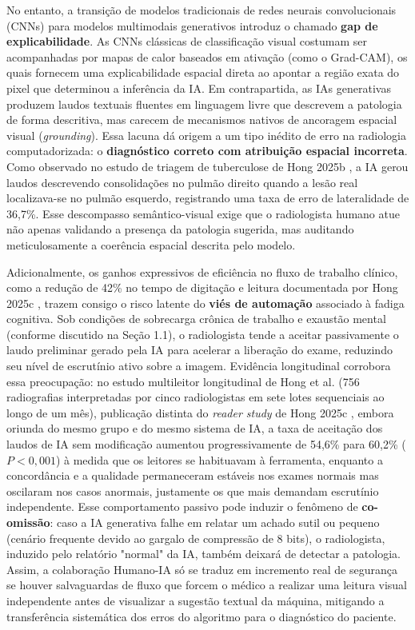 \documentclass[12pt,a4paper]{article}
\begin{document}
No entanto, a transição de modelos tradicionais de redes neurais convolucionais (CNNs) para modelos multimodais generativos introduz o chamado \textbf{gap de explicabilidade}. As CNNs clássicas de classificação visual costumam ser acompanhadas por mapas de calor baseados em ativação (como o Grad-CAM), os quais fornecem uma explicabilidade espacial direta ao apontar a região exata do pixel que determinou a inferência da IA. Em contrapartida, as IAs generativas produzem laudos textuais fluentes em linguagem livre que descrevem a patologia de forma descritiva, mas carecem de mecanismos nativos de ancoragem espacial visual (\textit{grounding}). Essa lacuna dá origem a um tipo inédito de erro na radiologia computadorizada: o \textbf{diagnóstico correto com atribuição espacial incorreta}. Como observado no estudo de triagem de tuberculose de Hong 2025b \cite{hong2025b}, a IA gerou laudos descrevendo consolidações no pulmão direito quando a lesão real localizava-se no pulmão esquerdo, registrando uma taxa de erro de lateralidade de 36,7\%. Esse descompasso semântico-visual exige que o radiologista humano atue não apenas validando a presença da patologia sugerida, mas auditando meticulosamente a coerência espacial descrita pelo modelo.

Adicionalmente, os ganhos expressivos de eficiência no fluxo de trabalho clínico, como a redução de 42\% no tempo de digitação e leitura documentada por Hong 2025c \cite{hong2025c}, trazem consigo o risco latente do \textbf{viés de automação} associado à fadiga cognitiva. Sob condições de sobrecarga crônica de trabalho e exaustão mental (conforme discutido na Seção 1.1), o radiologista tende a aceitar passivamente o laudo preliminar gerado pela IA para acelerar a liberação do exame, reduzindo seu nível de escrutínio ativo sobre a imagem. Evidência longitudinal corrobora essa preocupação: no estudo multileitor longitudinal de Hong et al. \cite{hongjacr} (756 radiografias interpretadas por cinco radiologistas em sete lotes sequenciais ao longo de um mês), publicação distinta do \textit{reader study} de Hong 2025c \cite{hong2025c}, embora oriunda do mesmo grupo e do mesmo sistema de IA, a taxa de aceitação dos laudos de IA sem modificação aumentou progressivamente de 54,6\% para 60,2\% ($P < 0,001$) à medida que os leitores se habituavam à ferramenta, enquanto a concordância e a qualidade permaneceram estáveis nos exames normais mas oscilaram nos casos anormais, justamente os que mais demandam escrutínio independente. Esse comportamento passivo pode induzir o fenômeno de \textbf{co-omissão}: caso a IA generativa falhe em relatar um achado sutil ou pequeno (cenário frequente devido ao gargalo de compressão de 8 bits), o radiologista, induzido pelo relatório "normal" da IA, também deixará de detectar a patologia. Assim, a colaboração Humano-IA só se traduz em incremento real de segurança se houver salvaguardas de fluxo que forcem o médico a realizar uma leitura visual independente antes de visualizar a sugestão textual da máquina, mitigando a transferência sistemática dos erros do algoritmo para o diagnóstico do paciente.
\end{document}
